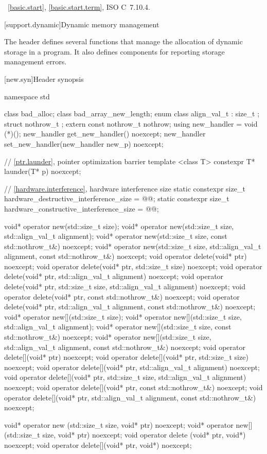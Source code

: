 \xref~\ref{basic.start}, \ref{basic.start.term},
ISO C~7.10.4.

[support.dynamic]{Dynamic memory management}

\pnum
The header
defines several
functions that manage the allocation of dynamic storage in a program.
It also defines components for reporting storage management errors.

[new.syn]{Header  synopsis}
%
%
%
%
%
\begin{codeblock}
namespace std {
  class bad_alloc;
  class bad_array_new_length;
  enum class align_val_t : size_t {};
  struct nothrow_t {};
  extern const nothrow_t nothrow;
  using new_handler = void (*)();
  new_handler get_new_handler() noexcept;
  new_handler set_new_handler(new_handler new_p) noexcept;

  // \ref{ptr.launder}, pointer optimization barrier
  template <class T> constexpr T* launder(T* p) noexcept;

  // \ref{hardware.interference}, hardware interference size
  static constexpr size_t hardware_destructive_interference_size = @\impdef{}@;
  static constexpr size_t hardware_constructive_interference_size = @\impdef{}@;
}

void* operator new(std::size_t size);
void* operator new(std::size_t size, std::align_val_t alignment);
void* operator new(std::size_t size, const std::nothrow_t&) noexcept;
void* operator new(std::size_t size, std::align_val_t alignment,
                   const std::nothrow_t&) noexcept;
void  operator delete(void* ptr) noexcept;
void  operator delete(void* ptr, std::size_t size) noexcept;
void  operator delete(void* ptr, std::align_val_t alignment) noexcept;
void  operator delete(void* ptr, std::size_t size, std::align_val_t alignment) noexcept;
void  operator delete(void* ptr, const std::nothrow_t&) noexcept;
void  operator delete(void* ptr, std::align_val_t alignment,
                      const std::nothrow_t&) noexcept;
void* operator new[](std::size_t size);
void* operator new[](std::size_t size, std::align_val_t alignment);
void* operator new[](std::size_t size, const std::nothrow_t&) noexcept;
void* operator new[](std::size_t size, std::align_val_t alignment,
                     const std::nothrow_t&) noexcept;
void  operator delete[](void* ptr) noexcept;
void  operator delete[](void* ptr, std::size_t size) noexcept;
void  operator delete[](void* ptr, std::align_val_t alignment) noexcept;
void  operator delete[](void* ptr, std::size_t size, std::align_val_t alignment) noexcept;
void  operator delete[](void* ptr, const std::nothrow_t&) noexcept;
void  operator delete[](void* ptr, std::align_val_t alignment,
                        const std::nothrow_t&) noexcept;

void* operator new  (std::size_t size, void* ptr) noexcept;
void* operator new[](std::size_t size, void* ptr) noexcept;
void  operator delete  (void* ptr, void*) noexcept;
void  operator delete[](void* ptr, void*) noexcept;
\end{codeblock}

